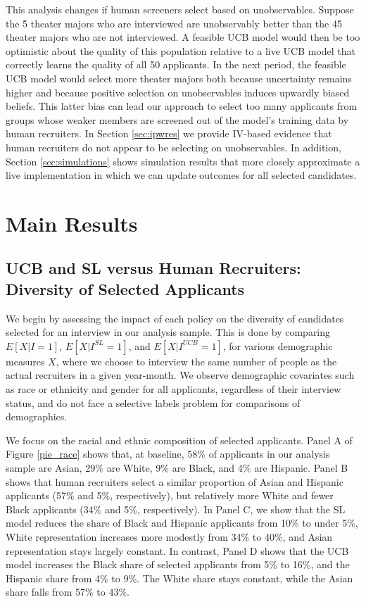 \documentclass[crop,noquery,editorname,historyrev,nosurname,runningno,sepcount]{RESTUD}
\begin{document}
This analysis changes if human screeners select based on unobservables.  Suppose the 5 theater majors who are interviewed are unobservably better than the 45 theater majors who are not interviewed. A feasible UCB model would then be too optimistic about the quality of this population relative to a live UCB model that correctly learns the quality of all 50 applicants.  In the next period, the feasible UCB model would select more theater majors both because uncertainty remains higher and because positive selection on unobservables induces upwardly biased beliefs.  This latter bias can lead our approach to select too many applicants from groups whose weaker members are screened out of the model's training data by human recruiters.  In Section \ref{sec:ipwres} we provide IV-based evidence that human recruiters do not appear to be selecting on unobservables. In addition, Section \ref{sec:simulations} shows simulation results that more closely approximate a live implementation in which we can update outcomes for all selected candidates.  


\section{Main Results} \label{mainresults}

\subsection{UCB and SL versus Human Recruiters: Diversity of Selected Applicants} \label{resdiversity}

We begin by assessing the impact of each policy on the diversity of candidates selected for an interview in our analysis sample.  This is done by comparing $E[X| I=1]$, $E[X | I^{SL}=1]$, and $E[X | I^{UCB}=1]$, for various demographic measures $X$, where we choose to interview the same number of people as the actual recruiters in a given year-month.  We observe demographic covariates such as race or ethnicity and gender for all applicants, regardless of their interview status, and do not face a selective labels problem for comparisons of demographics.   


We focus on the racial and ethnic composition of selected applicants.  Panel A of Figure \ref{pie_race} shows that, at baseline, 58\% of applicants in our analysis sample are Asian, 29\% are White, 9\% are Black, and 4\% are Hispanic.  Panel B shows that human recruiters select a similar proportion of Asian and Hispanic applicants (57\% and 5\%, respectively), but relatively more White and fewer Black applicants (34\% and 5\%, respectively).  In Panel C, we show that the SL model reduces the share of Black and Hispanic applicants from 10\% to under 5\%, White representation increases more modestly from 34\% to 40\%, and Asian representation stays largely constant.  In contrast, Panel D shows that the UCB model increases the Black share of selected applicants from 5\% to 16\%, and the Hispanic share from 4\% to 9\%.  The White share stays constant, while the Asian share falls from 57\% to 43\%.  
\end{document}
